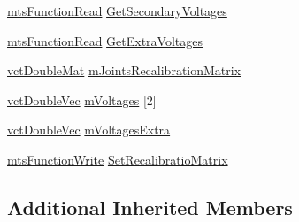 \begin{DoxyCompactItemize}
\hyperlink{classmts_function_read}{mts\-Function\-Read} \hyperlink{classmts_intuitive_research_kit_s_u_j_qt_widget_af490111d1072cf9094f175c5cfb852e4}{Get\-Secondary\-Voltages}
\item 
\hyperlink{classmts_function_read}{mts\-Function\-Read} \hyperlink{classmts_intuitive_research_kit_s_u_j_qt_widget_af25e65b20d4fb378811d700fd8e2430f}{Get\-Extra\-Voltages}
\item 
\hyperlink{vct_dynamic_matrix_types_8h_a48f1eb2461d20a99e824ee5753a37c84}{vct\-Double\-Mat} \hyperlink{classmts_intuitive_research_kit_s_u_j_qt_widget_ad559ad9515c5758b1e1bbc8c81e5b3b9}{m\-Joints\-Recalibration\-Matrix}
\item 
\hyperlink{vct_dynamic_vector_types_8h_ade4b3068c86fb88f41af2e5187e491c2}{vct\-Double\-Vec} \hyperlink{classmts_intuitive_research_kit_s_u_j_qt_widget_afc77e4a2acfa84ced9c42f7891a9582c}{m\-Voltages} \mbox{[}2\mbox{]}
\item 
\hyperlink{vct_dynamic_vector_types_8h_ade4b3068c86fb88f41af2e5187e491c2}{vct\-Double\-Vec} \hyperlink{classmts_intuitive_research_kit_s_u_j_qt_widget_a75cf34f3c661355931d7104bd2da78a5}{m\-Voltages\-Extra}
\item 
\hyperlink{classmts_function_write}{mts\-Function\-Write} \hyperlink{classmts_intuitive_research_kit_s_u_j_qt_widget_afc6542aa6640463b7f69885a9cbe9eb8}{Set\-Recalibratio\-Matrix}
\end{DoxyCompactItemize}
\subsection*{Additional Inherited Members}


